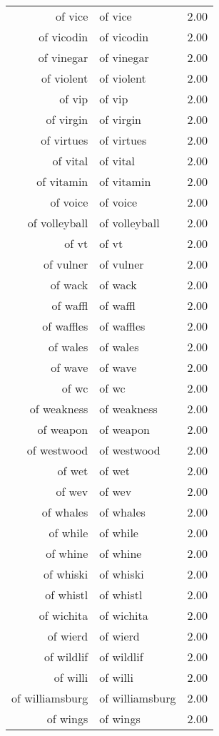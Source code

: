 \begin{table}[ht]
\begin{tabular}{rlr}
  of vice & of vice & 2.00 \\ 
  of vicodin & of vicodin & 2.00 \\ 
  of vinegar & of vinegar & 2.00 \\ 
  of violent & of violent & 2.00 \\ 
  of vip & of vip & 2.00 \\ 
  of virgin & of virgin & 2.00 \\ 
  of virtues & of virtues & 2.00 \\ 
  of vital & of vital & 2.00 \\ 
  of vitamin & of vitamin & 2.00 \\ 
  of voice & of voice & 2.00 \\ 
  of volleyball & of volleyball & 2.00 \\ 
  of vt & of vt & 2.00 \\ 
  of vulner & of vulner & 2.00 \\ 
  of wack & of wack & 2.00 \\ 
  of waffl & of waffl & 2.00 \\ 
  of waffles & of waffles & 2.00 \\ 
  of wales & of wales & 2.00 \\ 
  of wave & of wave & 2.00 \\ 
  of wc & of wc & 2.00 \\ 
  of weakness & of weakness & 2.00 \\ 
  of weapon & of weapon & 2.00 \\ 
  of westwood & of westwood & 2.00 \\ 
  of wet & of wet & 2.00 \\ 
  of wev & of wev & 2.00 \\ 
  of whales & of whales & 2.00 \\ 
  of while & of while & 2.00 \\ 
  of whine & of whine & 2.00 \\ 
  of whiski & of whiski & 2.00 \\ 
  of whistl & of whistl & 2.00 \\ 
  of wichita & of wichita & 2.00 \\ 
  of wierd & of wierd & 2.00 \\ 
  of wildlif & of wildlif & 2.00 \\ 
  of willi & of willi & 2.00 \\ 
  of williamsburg & of williamsburg & 2.00 \\ 
  of wings & of wings & 2.00 \\ 

\end{tabular}
\end{table}
